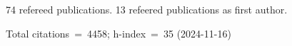 74 refereed publications. 13 refeered publications as first author.

Total citations~=~4458; h-index~=~35 (2024-11-16)